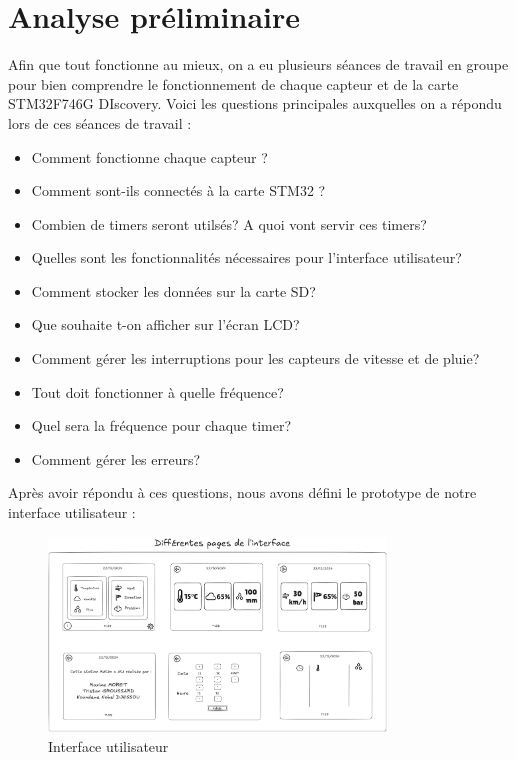 \documentclass[12pt]{article}
\begin{document}
\section{Analyse préliminaire}
Afin que tout fonctionne au mieux, on a eu plusieurs séances de travail en groupe pour bien comprendre le fonctionnement de chaque capteur et de la carte STM32F746G DIscovery.
Voici les questions principales auxquelles on a répondu lors de ces séances de travail :
\begin{itemize}
    \item Comment fonctionne chaque capteur ?
    \item Comment sont-ils connectés à la carte STM32 ?
    \item Combien de timers seront utilsés? A quoi vont servir ces timers?
    \item Quelles sont les fonctionnalités nécessaires pour l'interface utilisateur?
    \item Comment stocker les données sur la carte SD?
    \item Que souhaite t-on afficher sur l'écran LCD?
    \item Comment gérer les interruptions pour les capteurs de vitesse et de pluie?
    \item Tout doit fonctionner à quelle fréquence?
    \item Quel sera la fréquence pour chaque timer?
    \item Comment gérer les erreurs?
\end{itemize}

Après avoir répondu à ces questions, nous avons défini le prototype de notre interface utilisateur :

\begin{figure}[H]
    \capstart
    \centering
    \includegraphics[width=0.8\textwidth]{./images/prototype_interface.png}
    \caption{Interface utilisateur}
    \label{fig:interface}
\end{figure}
\end{document}

